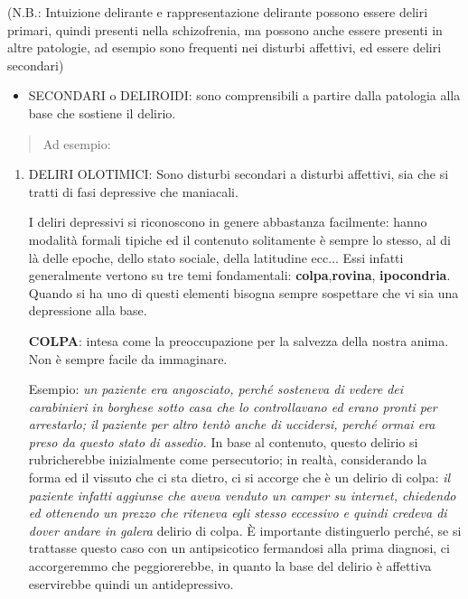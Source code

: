 \documentclass[]{article}
\begin{document}
(N.B.: Intuizione delirante e rappresentazione delirante possono essere
deliri primari, quindi presenti nella schizofrenia, ma possono anche
essere presenti in altre patologie, ad esempio sono frequenti nei
disturbi affettivi, ed essere deliri secondari)

\begin{itemize}
\item
  SECONDARI o DELIROIDI: sono comprensibili a partire dalla patologia
  alla base che sostiene il delirio.
\end{itemize}

\begin{quote}
Ad esempio:
\end{quote}

\begin{enumerate}
\def\labelenumi{\arabic{enumi}.}
\item
  DELIRI OLOTIMICI: Sono disturbi secondari a disturbi affettivi, sia
  che si tratti di fasi depressive che maniacali.

  I deliri depressivi si riconoscono in genere abbastanza facilmente:
  hanno modalità formali tipiche ed il contenuto solitamente è sempre lo
  stesso, al di là delle epoche, dello stato sociale, della latitudine
  ecc... Essi infatti generalmente vertono su tre temi fondamentali:
  \textbf{colpa},\textbf{rovina}, \textbf{ipocondria}. Quando si ha uno
  di questi elementi bisogna sempre sospettare che vi sia una
  depressione alla base.

  \textbf{COLPA}: intesa come la preoccupazione per la salvezza della
  nostra anima. Non è sempre facile da immaginare.

  Esempio: \emph{un paziente era angosciato, perché sosteneva di vedere
  dei carabinieri in borghese sotto casa che lo controllavano ed erano
  pronti per arrestarlo; il paziente per altro tentò anche di uccidersi,
  perché ormai era preso da questo stato di assedio.} In base al
  contenuto, questo delirio si rubricherebbe inizialmente come
  persecutorio; in realtà, considerando la forma ed il vissuto che ci
  sta dietro, ci si accorge che è un delirio di colpa: \emph{il paziente
  infatti aggiunse che aveva venduto un camper su internet, chiedendo ed
  ottenendo un prezzo che riteneva egli stesso eccessivo e quindi
  credeva di dover andare in galera} delirio di colpa. È importante
  distinguerlo perché, se si trattasse questo caso con un antipsicotico
  fermandosi alla prima diagnosi, ci accorgeremmo che peggiorerebbe, in
  quanto la base del delirio è affettiva eservirebbe quindi un
  antidepressivo.


\end{enumerate}
\end{document}
